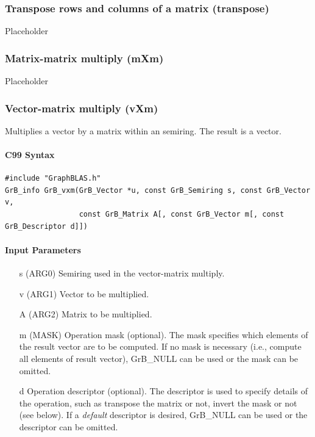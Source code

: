\documentclass[11pt]{extarticle}
\begin{document}
\subsubsection{Transpose rows and columns of a matrix ({\sf transpose})}

Placeholder

\subsubsection{Matrix-matrix multiply ({\sf mXm})}

Placeholder

\subsubsection{Vector-matrix multiply ({\sf vXm})}

Multiplies a vector by a matrix within an semiring. The result is a vector.

\paragraph{C99 Syntax}

\begin{verbatim}
#include "GraphBLAS.h"
GrB_info GrB_vxm(GrB_Vector *u, const GrB_Semiring s, const GrB_Vector v, 
                 const GrB_Matrix A[, const GrB_Vector m[, const GrB_Descriptor d]])
\end{verbatim}


\paragraph{Input Parameters}

\begin{itemize}
	\item[{\sf s}] ({\sf ARG0}) Semiring used in the vector-matrix
	multiply.

	\item[{\sf v}] ({\sf ARG1}) Vector to be multiplied.

	\item[{\sf A}] ({\sf ARG2}) Matrix to be multiplied.

	\item[{\sf m}] ({\sf MASK}) Operation mask (optional). The mask
	specifies which elements of the result vector are to be computed.
	If no mask is necessary (i.e., compute all elements of result
	vector), {\sf GrB\_NULL} can be used or the mask can be omitted.

	\item[{\sf d}] Operation descriptor (optional). The descriptor
	is used to specify details of the operation, such as transpose
	the matrix or not, invert the mask or not (see below). If a
	\emph{default} descriptor is desired, {\sf GrB\_NULL} can be
	used or the descriptor can be omitted.
\end{itemize}
\end{document}
